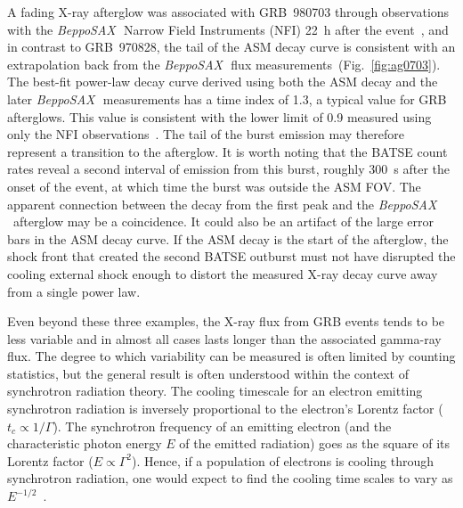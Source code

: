 \documentclass{aastex}
\def\sax{{\it BeppoSAX\,}}
\begin{document}
\begin{multicols}{2}
A fading X-ray afterglow was associated with GRB~980703 through
observations with the \sax~Narrow Field Instruments (NFI) 22~h after
the event~\citep{vgoog99}, and in contrast to GRB~970828, the tail of
the ASM decay curve is consistent with an extrapolation back from the
\sax~flux measurements~(Fig.~\ref{fig:ag0703}).  The best-fit
power-law decay curve derived using both the ASM decay and the later
\sax~measurements has a time index of 1.3, a typical value for GRB
afterglows.  This value is consistent with the lower limit of 0.9
measured using only the NFI observations~\citep{vgoog99}.  The tail of
the burst emission may therefore represent a transition to the
afterglow.  It is worth noting that the BATSE count rates reveal a
second interval of emission from this burst, roughly 300~s after the
onset of the event, at which time the burst was outside the ASM FOV.
The apparent connection between the decay from the first peak and the
\sax~afterglow may be a coincidence.  It could also be an artifact of
the large error bars in the ASM decay curve.  If the ASM decay is the
start of the afterglow, the shock front that created the second BATSE
outburst must not have disrupted the cooling external shock enough to
distort the measured X-ray decay curve away from a single power law.

Even beyond these three examples, the X-ray flux from GRB events tends
to be less variable and in almost all cases lasts longer than the
associated gamma-ray flux.  The degree to which variability can be
measured is often limited by counting statistics, but the general
result is often understood within the context of synchrotron
radiation theory.  The cooling timescale for an electron emitting
synchrotron radiation is inversely proportional to the electron's
Lorentz factor ($t_c \propto 1/\Gamma$).  The synchrotron frequency of
an emitting electron (and the characteristic photon energy $E$ of the
emitted radiation) goes as the square of its Lorentz factor ($E
\propto \Gamma^2$).  Hence, if a population of electrons is cooling
through synchrotron radiation, one would expect to find the cooling
time scales to vary as $E^{-1/2}$~\citep{rl79,piran99,wg99}.


\end{multicols}
\end{document}
